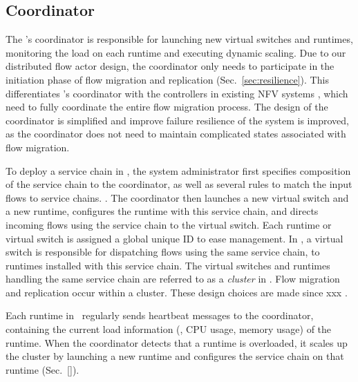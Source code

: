 \subsection{Coordinator}
\label{sec:coordinator}

The \nfactor's coordinator is responsible for launching new virtual switches and runtimes, monitoring the load on each runtime and executing dynamic scaling. Due to our distributed flow actor design, the coordinator only needs to participate in the initiation phase of flow migration and replication (Sec.~\ref{sec:resilience}). This differentiates \nfactor's coordinator with the controllers in existing NFV systems \cite{gember2015opennf}\cite{rajagopalan2013split}, which need to fully coordinate the entire flow migration process. 
The design of the coordinator is simplified and improve failure resilience of the system is improved, as the coordinator does not need to maintain complicated states associated with flow migration.

To deploy a service chain in \nfactor, the system administrator first specifies composition of the service chain to the coordinator, as well as several rules to match the input flows to service chains. . The coordinator then launches a new virtual switch and a new runtime, configures the runtime with this service chain, and directs incoming flows using the service chain to the virtual switch. Each runtime or virtual switch is assigned a global unique ID to ease management.  In \nfactor, a virtual switch is responsible for dispatching flows using the same service chain, to runtimes installed with this service chain. The virtual switches and runtimes handling the same service chain are referred to as a {\em cluster} in \nfactor. Flow migration and replication occur within a cluster. These design choices are made since xxx .


Each runtime in \nfactor~regularly sends heartbeat messages to the coordinator, containing the current load information (\ie, CPU usage, memory usage) of the runtime. When the coordinator detects that a runtime is overloaded, it scales up the cluster by launching a new runtime and configures the service chain on that runtime (Sec.~\ref{}). 

